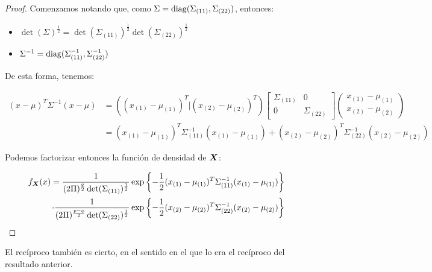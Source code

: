   \begin{proof}
    Comenzamos notando que, como $\Sigma = \operatorname{diag}(\Sigma_{(11)},\Sigma_{(22)})$, entonces:
    \begin{itemize}
    \item $\det(\Sigma)^{\frac{1}{2}} = \det(\Sigma_{(11)})^{\frac{1}{2}} \det(\Sigma_{(22)})^{\frac{1}{2}}$
      \item $ \Sigma^{-1} = \operatorname{diag}(\Sigma_{(11)}^{-1}, \Sigma_{(22)}^{-1})$
    \end{itemize}

    De esta forma, tenemos:
    
    \[
    \begin{split}
      (x-\mu)^T \Sigma^{-1}(x-\mu) & = \left( (x_{(1)}- \mu_{(1)})^T | (x_{(2)}-\mu_{(2)})^T \right) \begin{bmatrix} \Sigma_{(11)} & 0 \\ 0 & \Sigma_{(22)} \end{bmatrix}
      \left(\begin{array}{c} x_{(1)} - \mu_{(1)} \\ \hline
        x_{(2)} - \mu_{(2)} \end{array}\right) \\
       & = (x_{(1)}- \mu_{(1)})^T \Sigma_{(11)}^{-1}  (x_{(1)}- \mu_{(1)}) +  (x_{(2)}- \mu_{(2)})^T \Sigma_{(22)}^{-1}  (x_{(2)}- \mu_{(2)})
      \end{split}
    \]
    
    Podemos factorizar entonces la función de densidad de $\boldsymbol{X}$:
    
    \[
    \begin{split}
    f_{\boldsymbol{X}}(x) =  \frac{1}{(2\Pi)^{\frac{q}{2}} \det(\Sigma_{(11)})^{\frac{1}{2}} } \exp \left\{ - \frac{1}{2} (x_{(1)}- \mu_{(1)})^T \Sigma_{(11)}^{-1}  (x_{(1)}- \mu_{(1)})\right\} \\
    \cdot \frac{1}{(2\Pi)^{\frac{p-q}{2}} \det(\Sigma_{(22)})^{\frac{1}{2}} } \exp \left\{ - \frac{1}{2} (x_{(2)}- \mu_{(2)})^T \Sigma_{(22)}^{-1}  (x_{(2)}- \mu_{(2)})\right\}
    \end{split}
    \]
    
  \end{proof}

  El recíproco también es cierto, en el sentido en el que lo era el recíproco del resultado anterior.

